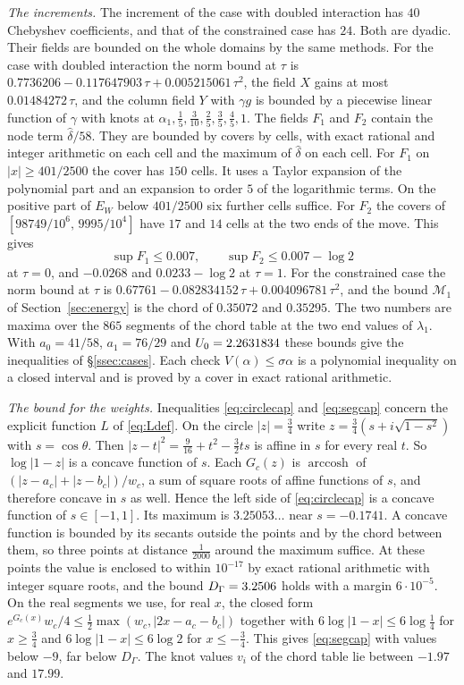 \emph{The increments.} The increment of the case with doubled interaction has $40$ Chebyshev coefficients, and
that of the constrained case has $24$. Both are dyadic. Their fields are bounded on the whole domains by the
same methods. For the case with doubled interaction the norm bound at $\tau$ is $0.7736206-0.117647903\,\tau+0.005215061\,\tau^2$,
the field $X$ gains at most $0.01484272\,\tau$, and the column field $Y$ with $\gamma g$ is bounded by a piecewise
linear function of $\gamma$ with knots at $\alpha_1,\frac15,\frac3{10},\frac25,\frac35,\frac45,1$. The fields $F_1$ and $F_2$
contain the node term $\hat\delta/58$. They are bounded by covers by cells, with exact rational and integer arithmetic on each cell
and the maximum of $\hat\delta$ on each cell. For $F_1$ on $|x|\ge401/2500$ the cover has $150$ cells. It uses a Taylor expansion of the
polynomial part and an expansion to order $5$ of the logarithmic terms. On the positive part of $E_W$ below $401/2500$ six
further cells suffice. For $F_2$ the covers of $[98749/10^6,\,9995/10^4]$ have $17$ and $14$ cells at the two ends of the move. This gives
\[
 \sup F_1\le0.007,\qquad \sup F_2\le0.007-\log2
\]
at $\tau=0$, and $-0.0268$ and $0.0233-\log2$ at $\tau=1$. For the constrained case the norm bound at $\tau$ is
$0.67761-0.082834152\,\tau+0.004096781\,\tau^2$, and the bound $\mathcal M_1$ of Section~\ref{sec:energy} is the chord of
$0.35072$ and $0.35295$. The two numbers are maxima over the $865$ segments of the chord table at the two end values of
$\lambda_1$. With $a_0=41/58$, $a_1=76/29$ and $U_0=2.2631834$ these bounds give the inequalities of \S\ref{ssec:cases}.
Each check $V(\alpha)\le\sigma\alpha$ is a polynomial inequality on a closed interval and is proved by a cover in exact
rational arithmetic.

\emph{The bound for the weights.} Inequalities \eqref{eq:circlecap} and \eqref{eq:segcap} concern the explicit function $L$ of
\eqref{eq:Ldef}. On the circle $|z|=\frac34$ write $z=\frac34(s+i\sqrt{1-s^2})$ with $s=\cos\theta$. Then $|z-t|^2=\frac9{16}+t^2-\frac32ts$
is affine in $s$ for every real $t$. So $\log|1-z|$ is a concave function of $s$. Each $G_c(z)$ is $\operatorname{arccosh}$ of
$(|z-a_c|+|z-b_c|)/w_c$, a sum of square roots of affine functions of $s$, and therefore concave in $s$ as well. Hence the left
side of \eqref{eq:circlecap} is a concave function of $s\in[-1,1]$. Its maximum is $3.25053\ldots$ near $s=-0.1741$. A concave function
is bounded by its secants outside the points and by the chord between them, so three points at distance $\frac1{2000}$ around the
maximum suffice. At these points the value is enclosed to within $10^{-17}$ by exact rational arithmetic with integer square roots,
and the bound $D_\Gamma=3.2506$ holds with a margin $6\cdot10^{-5}$. On the real segments we use, for real $x$, the closed form
$e^{G_c(x)}w_c/4\le\frac12\max(w_c,|2x-a_c-b_c|)$ together with $6\log|1-x|\le6\log\frac14$ for $x\ge\frac34$ and
$6\log|1-x|\le6\log2$ for $x\le-\frac34$. This gives \eqref{eq:segcap} with values below $-9$, far below $D_\Gamma$.
The knot values $v_i$ of the chord table lie between $-1.97$ and $17.99$.

